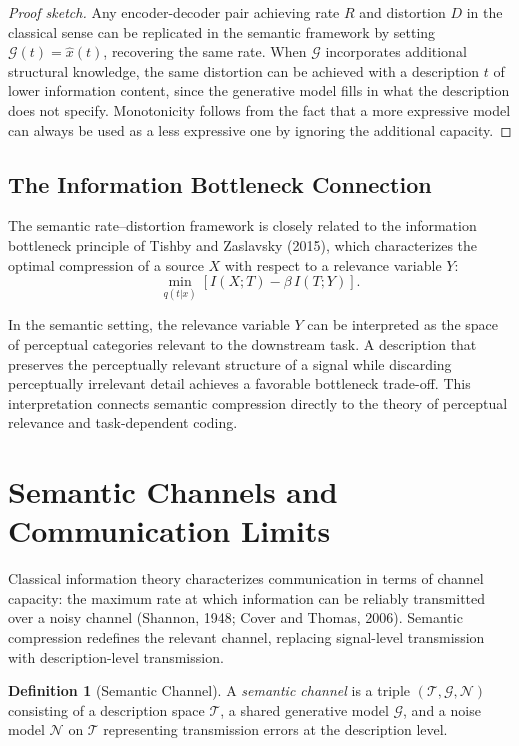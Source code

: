 \documentclass[11pt,a4paper]{article}
\theoremstyle{definition}
\newtheorem{definition}[theorem]{Definition}
\theoremstyle{remark}
\begin{document}
\begin{proof}[Proof sketch]
Any encoder-decoder pair achieving rate $R$ and distortion $D$ in the classical sense can be replicated in the semantic framework by setting $\mathcal{G}(t) = \hat{x}(t)$, recovering the same rate. When $\mathcal{G}$ incorporates additional structural knowledge, the same distortion can be achieved with a description $t$ of lower information content, since the generative model fills in what the description does not specify. Monotonicity follows from the fact that a more expressive model can always be used as a less expressive one by ignoring the additional capacity.
\end{proof}

\subsection{The Information Bottleneck Connection}

The semantic rate--distortion framework is closely related to the information bottleneck principle of Tishby and Zaslavsky (2015), which characterizes the optimal compression of a source $X$ with respect to a relevance variable $Y$:
\[
\min_{q(t|x)} \left[ I(X; T) - \beta \, I(T; Y) \right].
\]

In the semantic setting, the relevance variable $Y$ can be interpreted as the space of perceptual categories relevant to the downstream task. A description that preserves the perceptually relevant structure of a signal while discarding perceptually irrelevant detail achieves a favorable bottleneck trade-off. This interpretation connects semantic compression directly to the theory of perceptual relevance and task-dependent coding.

\section{Semantic Channels and Communication Limits}
\label{sec:channels}

Classical information theory characterizes communication in terms of channel capacity: the maximum rate at which information can be reliably transmitted over a noisy channel (Shannon, 1948; Cover and Thomas, 2006). Semantic compression redefines the relevant channel, replacing signal-level transmission with description-level transmission.

\begin{definition}[Semantic Channel]
A \emph{semantic channel} is a triple $(\mathcal{T}, \mathcal{G}, \mathcal{N})$ consisting of a description space $\mathcal{T}$, a shared generative model $\mathcal{G}$, and a noise model $\mathcal{N}$ on $\mathcal{T}$ representing transmission errors at the description level.
\end{definition}
\end{document}
